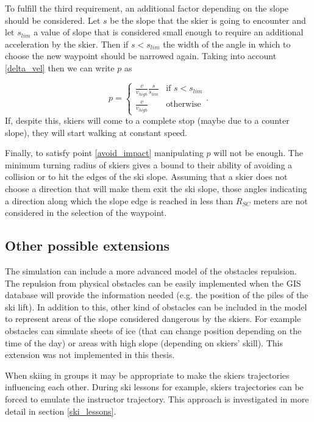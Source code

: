 \documentclass[12pt,a4paper,twoside]{book}
\begin{document}
To fulfill the third requirement, an additional factor depending on the slope should be considered. Let $s$ be the slope that the skier is going to encounter and let $s_{lim}$ a value of slope that is considered small enough to require an additional acceleration by the skier. Then if $s<s_{lim}$ the width of the angle in which to choose the new waypoint should be narrowed again. Taking into account \ref{delta_vel} then we can write $p$ as

\begin{equation}
p=\begin{cases}
   \frac{v}{v_{high}}\frac{s}{s_{lim}} & \text{if } s < s_{lim} \\
   \frac{v}{v_{high}} & \text{otherwise}
\end{cases}.
\end{equation}
If, despite this, skiers will come to a complete stop (maybe due to a counter slope), they will start walking at constant speed.

Finally, to satisfy point \ref{avoid_impact} manipulating $p$ will not be enough. The minimum turning radius of skiers gives a bound to their ability of avoiding a collision or to hit the edges of the ski slope. Assuming that a skier does not choose a direction that will make them exit the ski slope, those angles indicating a direction along which the slope edge is reached in less than $R_{SC}$ meters are not considered in the selection of the waypoint.

\subsection{Other possible extensions}
The simulation can include a more advanced model of the obstacles repulsion. The repulsion from physical obstacles can be easily implemented when the GIS database will provide the information needed (e.g. the position of the piles of the ski lift). In addition to this, other kind of obstacles can be included in the model to represent areas of the slope considered dangerous by the skiers. For example obstacles can simulate sheets of ice (that can change position depending on the time of the day) or areas with high slope (depending on skiers' skill). This extension was not implemented in this thesis.

When skiing in groups it may be appropriate to make the skiers trajectories influencing each other. During ski lessons for example, skiers trajectories can be forced to emulate the instructor trajectory. This approach is investigated in more detail in section \ref{ski_lessons}.
\end{document}
